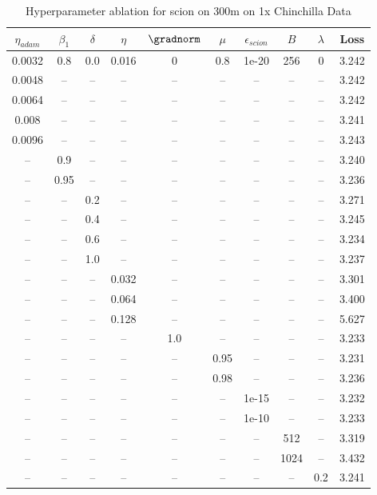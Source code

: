 \begin{table}[h!]
\centering
\caption{Hyperparameter ablation for scion on 300m on 1x Chinchilla Data}
\label{tab:ablation_scion_300m_on_1x_chinchilla_data}
\begin{tabular}{cccccccccc}
\toprule
$\eta_{adam}$ & $\beta_1$ & $\delta$ & $\eta$ & $\gradnorm$ & $\mu$ & $\epsilon_{scion}$ & $B$ & $\lambda$ & Loss \\
\midrule
0.0032 & 0.8 & 0.0 & 0.016 & 0 & 0.8 & 1e-20 & 256 & 0 & 3.242 \\
\midrule
0.0048 & -- & -- & -- & -- & -- & -- & -- & -- & 3.242 \\
0.0064 & -- & -- & -- & -- & -- & -- & -- & -- & 3.242 \\
0.008 & -- & -- & -- & -- & -- & -- & -- & -- & 3.241 \\
0.0096 & -- & -- & -- & -- & -- & -- & -- & -- & 3.243 \\
-- & 0.9 & -- & -- & -- & -- & -- & -- & -- & 3.240 \\
-- & 0.95 & -- & -- & -- & -- & -- & -- & -- & 3.236 \\
-- & -- & 0.2 & -- & -- & -- & -- & -- & -- & 3.271 \\
-- & -- & 0.4 & -- & -- & -- & -- & -- & -- & 3.245 \\
-- & -- & 0.6 & -- & -- & -- & -- & -- & -- & 3.234 \\
-- & -- & 1.0 & -- & -- & -- & -- & -- & -- & 3.237 \\
-- & -- & -- & 0.032 & -- & -- & -- & -- & -- & 3.301 \\
-- & -- & -- & 0.064 & -- & -- & -- & -- & -- & 3.400 \\
-- & -- & -- & 0.128 & -- & -- & -- & -- & -- & 5.627 \\
-- & -- & -- & -- & 1.0 & -- & -- & -- & -- & 3.233 \\
-- & -- & -- & -- & -- & 0.95 & -- & -- & -- & 3.231 \\
-- & -- & -- & -- & -- & 0.98 & -- & -- & -- & 3.236 \\
-- & -- & -- & -- & -- & -- & 1e-15 & -- & -- & 3.232 \\
-- & -- & -- & -- & -- & -- & 1e-10 & -- & -- & 3.233 \\
-- & -- & -- & -- & -- & -- & -- & 512 & -- & 3.319 \\
-- & -- & -- & -- & -- & -- & -- & 1024 & -- & 3.432 \\
-- & -- & -- & -- & -- & -- & -- & -- & 0.2 & 3.241 \\
\bottomrule
\end{tabular}
\end{table}


